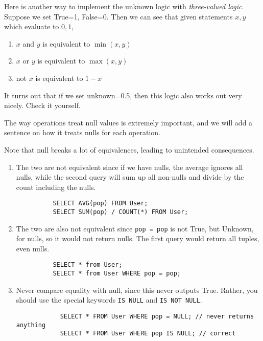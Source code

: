     \begin{theorem}
      Here is another way to implement the unknown logic with \textit{three-valued logic}. Suppose we set True=1, False=0. Then we can see that given statements $x, y$ which evaluate to $0, 1$, 
      \begin{enumerate}
        \item $x$ and $y$ is equivalent to $\min(x, y)$
        \item $x$ or $y$ is equivalent to $\max(x, y)$ 
        \item not $x$ is equivalent to $1 - x$
      \end{enumerate}
      It turns out that if we set unknown=0.5, then this logic also works out very nicely. Check it yourself. 
    \end{theorem}

    The way operations treat null values is extremely important, and we will add a sentence on how it treats nulls for each operation. 

    \begin{example}[Warnings]
      Note that null breaks a lot of equivalences, leading to unintended consequences. 
      \begin{enumerate}
        \item The two are not equivalent since if we have nulls, the average ignores all nulls, while the second query will sum up all non-nulls and divide by the count including the nulls. 
        \begin{lstlisting}
          SELECT AVG(pop) FROM User; 
          SELECT SUM(pop) / COUNT(*) FROM User; 
        \end{lstlisting}

        \item The two are also not equivalent since \texttt{pop = pop} is not True, but Unknown, for nulls, so it would not return nulls. The first query would return all tuples, even nulls. 
        \begin{lstlisting}
          SELECT * from User; 
          SELECT * from User WHERE pop = pop; 
        \end{lstlisting}

        \item Never compare equality with null, since this never outputs True. Rather, you should use the special keywords \texttt{IS NULL} and \texttt{IS NOT NULL}. 
          \begin{lstlisting}
            SELECT * FROM User WHERE pop = NULL; // never returns anything 
            SELECT * FROM User WHERE pop IS NULL; // correct 
          \end{lstlisting}
      \end{enumerate}
    \end{example}

